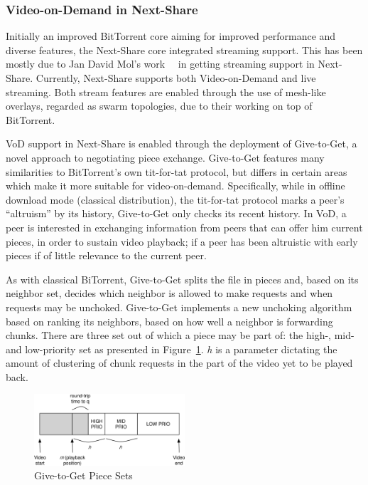 \subsubsection{Video-on-Demand in Next-Share}

Initially an improved BitTorrent core aiming for improved performance and
diverse features, the Next-Share core integrated streaming support. This has
been mostly due to Jan David Mol's
work~\cite{give-to-get}~\cite{design-p2p-live} in getting streaming
support in Next-Share. Currently, Next-Share supports both Video-on-Demand
and live streaming. Both stream features are enabled through the use of
mesh-like overlays, regarded as swarm topologies, due to their working on top
of BitTorrent.

VoD support in Next-Share is enabled through the deployment of Give-to-Get, a
novel approach to negotiating piece exchange. Give-to-Get features many
similarities to BitTorrent's own tit-for-tat protocol, but differs in certain
areas which make it more suitable for video-on-demand. Specifically, while in
offline download mode (classical distribution), the tit-for-tat protocol marks
a peer's ``altruism'' by its history, Give-to-Get only checks its recent
history. In VoD, a peer is interested in exchanging information from peers that
can offer him current pieces, in order to sustain video playback; if a peer
has been altruistic with early pieces if of little relevance to the current
peer.

As with classical BiTorrent, Give-to-Get splits the file in pieces and, based
on its neighbor set, decides which neighbor is allowed to make requests and
when requests may be unchoked. Give-to-Get implements a new unchoking
algorithm based on ranking its neighbors, based on how well a neighbor is
forwarding chunks. There are three set out of which a piece may be part of:
the high-, mid- and low-priority set as presented in
Figure~\ref{fig:multimedia-dist:gtg-sets}. \textit{h} is a parameter dictating the amount of
clustering of chunk requests in the part of the video yet to be played back.

\begin{figure}
  \centering
  \includegraphics[width=0.5\textwidth]{src/img/multimedia-dist/gtg-sets}
  \caption{Give-to-Get Piece Sets}
  \label{fig:multimedia-dist:gtg-sets}
\end{figure}


